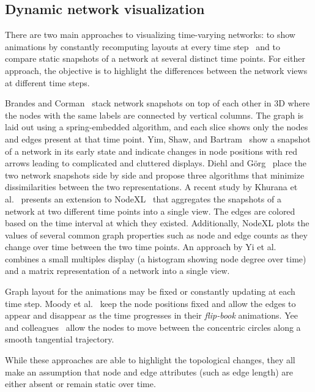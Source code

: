 \documentclass[12pt]{cmuthesis}
\begin{document}
  \subsection{Dynamic network visualization}

  There are two main approaches to visualizing time-varying networks: to show
  animations by constantly recomputing layouts at every time step~\cite{Yee2001}
  and to compare
  static snapshots of a network at several distinct time points. For either
  approach, the objective is to highlight the differences between the network
  views at different time steps.

  Brandes and Corman~\cite{Brandes2003a} stack network snapshots on top of each
  other in 3D where the nodes with the same labels are connected by vertical columns.
  The graph is laid out using a spring-embedded algorithm, and each slice shows
  only the nodes and edges present at that time point. Yim, Shaw, and
  Bartram~\cite{Yim2009} show a snapshot of a network in its early state and
  indicate changes in node positions with red arrows leading to complicated and
  cluttered displays. Diehl and G\"{o}rg~\cite{Diehl2002} place the two network
  snapshots side by side and propose three algorithms that minimize
  dissimilarities between the two representations. A recent study by Khurana et
  al.~\cite{Khurana2011} presents an extension to NodeXL~\cite{Bonsignore2009}
  that aggregates the snapshots of a network at two different time points into a
  single view. The edges are colored based on the time interval at which they
  existed. Additionally, NodeXL plots the values of several common graph
  properties such as node and edge counts as they change over time between the two
  time points. An approach by Yi et al.~\cite{Yi2010} combines a small multiples
  display (a histogram showing node degree over time) and a matrix representation
  of a network into a single view.

  Graph layout for the animations may be fixed or constantly updating at each time
  step. Moody et al.~\cite{Moody2005} keep the node positions fixed and allow the
  edges to appear and disappear as the time progresses in their \emph{flip-book}
  animations. Yee and colleagues~\cite{Yee2001} allow the nodes to move between
  the concentric circles along a smooth tangential trajectory.

  While these approaches are able to highlight the topological changes, they all
  make an assumption that node and edge attributes (such as edge length) are
  either absent or remain static over time.
\end{document}
